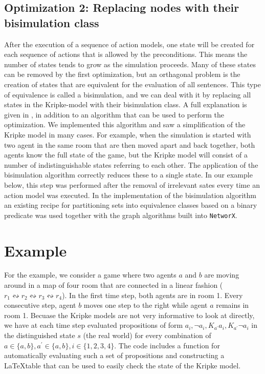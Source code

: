 \documentclass[a4paper]{scrartcl}
\begin{document}
\subsection*{Optimization 2: Replacing nodes with their bisimulation class}
After the execution of a sequence of action models, one state will be created for each sequence of actions that is allowed by the preconditions. This means the number of states tends to grow as the simulation proceeds. Many of these states can be removed by the first optimization, but an orthagonal problem is the creation of states that are equivalent for the evaluation of all sentences. This type of equivalence is called a bisimulation, and we can deal with it by replacing all states in the Kripke-model with their bisimulation class. A full explanation is given in \cite{Bisimulations}, in addition to an algorithm that can be used to perform the optimization. We implemented this algorithm and saw a simplification of the Kripke model in many cases. For example, when the simulation is started with two agent in the same room that are then moved apart and back together, both agents know the full state of the game, but the Kripke model will consist of a number of indistinguishable states referring to each other. The application of the bisimulation algorithm correctly reduces these to a single state. In our example below, this step was performed after the removal of irrelevant sates every time an action model was executed. In the implementation of the bisimulation algorithm an existing recipe for partitioning sets into equivalence classes based on a binary predicate was used \cite{partition} together with the graph algorithms built into \texttt{NetworX}.

\section*{Example}
For the example, we consider a game where two agents $a$ and $b$ are moving around in a map of four room that are connected in a linear fashion ($r_1 \leftrightsquigarrow  r_2 \leftrightsquigarrow r_3 \leftrightsquigarrow r_4$). In the first time step, both agents are in room 1. Every consecutive step, agent $b$ moves one step to the right while agent $a$ remains in room 1. Becuase the Kripke models are not very informative to look at directly, we have at each time step evaluated propositions of form $a_i, \neg a_i, K_{a^\prime} a_i, K_{a^\prime} \neg a_i$ in the distinguished state $s$ (the real world) for every combination of $a \in \{a, b\}, a^\prime \in \{a, b\}, i \in \{1,2,3,4\}$. The code includes a function for automatically evaluating such a set of propositions and constructing a \LaTeX table that can be used to easily check the state of the Kripke model. 
\end{document}
